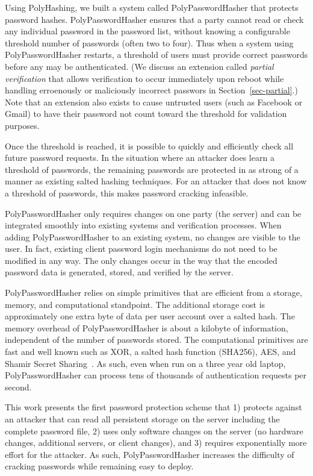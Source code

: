 Using PolyHashing, we built a system called PolyPasswordHasher that 
protects password hashes.  PolyPasswordHasher ensures that a party cannot 
read or check any individual password in the password list, without knowing
a configurable threshold number of passwords (often two to four).   Thus when 
a system using PolyPasswordHasher restarts, a threshold of users must provide correct
passwords before any may be authenticated.   (We discuss an extension called
\emph{partial verification} that allows verification to occur immediately
upon reboot while handling erroenously or maliciously incorrect passwors
in Section~\ref{sec-partial}.)
Note that an extension also exists to cause untrusted users (such as 
Facebook or Gmail) to have their password not count toward the threshold for
validation purposes.    

Once the threshold is 
reached, it is possible to quickly and efficiently check all future password
requests.  
In the situation where an attacker does learn a threshold of passwords, the 
remaining passwords are 
protected in as strong of a manner as existing salted hashing 
techniques.  For an attacker that does not know a threshold of passwords, 
this makes password cracking infeasible.

PolyPasswordHasher only requires changes on one party (the server) and can be 
integrated smoothly into existing systems and verification processes.  %
When adding PolyPasswordHasher to an existing system, no changes are visible to 
the user.  In fact, existing
client password login mechanisms do not need to be modified in any way.   The
only changes occur in the way that the encoded password data is generated,
stored, and verified by the server.


PolyPasswordHasher relies on simple primitives that are efficient from a storage, 
memory, and computational standpoint.   The additional storage cost is 
approximately one extra byte of data per user account over a salted 
hash.   The memory overhead of PolyPasswordHasher is about a kilobyte of 
information, independent of the number of passwords stored.
The computational primitives are fast and well known
such as XOR, a salted hash function (SHA256), AES, and Shamir Secret 
Sharing~\cite{shamir1979share}.
As such, even when run on a three year old laptop, PolyPasswordHasher can process 
tens of thousands of authentication requests per second.


This work presents the first password protection scheme that 1) protects 
against an attacker that can read all persistent storage on the server
including the complete password file, 
2) uses only software changes on the server (no hardware changes, 
additional servers, or client changes), and 3) requires exponentially more 
effort for the attacker.   
As such, PolyPasswordHasher increases the difficulty
of cracking passwords while remaining easy to deploy.

